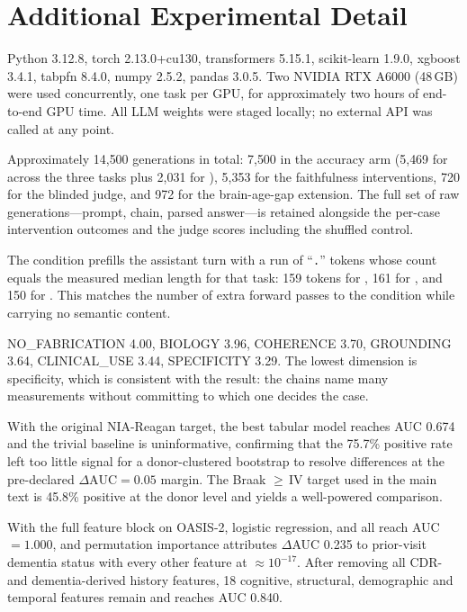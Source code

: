 \section{Additional Experimental Detail}
\label{app:detail}

 Python 3.12.8, torch 2.13.0+cu130, transformers 5.15.1,
scikit-learn 1.9.0, xgboost 3.4.1, tabpfn 8.4.0, numpy 2.5.2, pandas 3.0.5. Two NVIDIA RTX A6000
(48\,GB) were used concurrently, one task per GPU, for approximately two hours of end-to-end GPU
time. All LLM weights were staged locally; no external API was called at any point.

 Approximately 14{,}500 generations in total: 7{,}500 in the accuracy arm
(5{,}469 for \qwenseven across the three tasks plus 2{,}031 for \qwensmall), 5{,}353 for the
faithfulness interventions, 720 for the blinded judge, and 972 for the brain-age-gap extension.
The full set of raw generations---prompt, chain, parsed answer---is retained alongside the
per-case intervention outcomes and the judge scores including the shuffled control.

 The \filler condition prefills the assistant turn with a run of
``\texttt{.}'' tokens whose count equals the measured median \cotarm length for that task: 159 tokens
for \taskone, 161 for \tasktwo, and 150 for \taskthree. This matches the number of extra forward
passes to the \cotarm condition while carrying no semantic content.

 NO\_FABRICATION 4.00,
BIOLOGY 3.96, COHERENCE 3.70, GROUNDING 3.64, CLINICAL\_USE 3.44, SPECIFICITY 3.29. The lowest
dimension is specificity, which is consistent with the \esa result: the chains name many
measurements without committing to which one decides the case.

 With the original NIA-Reagan target, the best tabular model reaches
AUC 0.674 and the trivial baseline is uninformative, confirming that the 75.7\% positive rate left
too little signal for a donor-clustered bootstrap to resolve differences at the pre-declared
$\Delta\text{AUC}=0.05$ margin. The Braak $\geq$\,IV target used in the main text is 45.8\% positive
at the donor level and yields a well-powered comparison.

 With the full \ltoc feature block on OASIS-2, logistic regression,
\xgb and \tabpfn all reach AUC $=1.000$, and permutation importance attributes $\Delta$AUC 0.235 to
prior-visit dementia status with every other feature at $\approx 10^{-17}$. After removing all CDR-
and dementia-derived history features, 18 cognitive, structural, demographic and temporal features
remain and \xgb reaches AUC 0.840.

